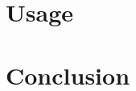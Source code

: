 \documentclass[english,inz,shortabstract]{iithesis}
\begin{document}
\chapter{Usage}

\chapter{Conclusion}



\end{document}
